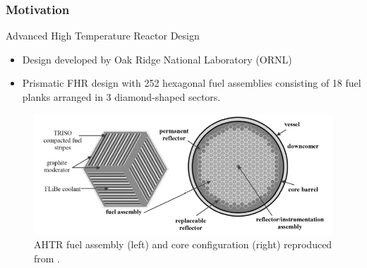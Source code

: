 \begin{frame}
  \frametitle{Motivation}
  \begin{block}{Advanced High Temperature Reactor Design}
    \begin{itemize}
      \item Design developed by Oak Ridge National Laboratory (ORNL)
      \item Prismatic FHR design with 252 hexagonal fuel assemblies consisting of 
      18 fuel planks arranged in 3 diamond-shaped sectors. 
    \end{itemize}
  \end{block}
  \begin{figure}[]
    \centering
    \includegraphics[width=0.8\linewidth]{../docs/figures/ahtr.png} 
    \caption{\acrlong{AHTR} fuel assembly (left) and core configuration (right) 
    reproduced from \cite{ramey_monte_2018}.}
    \label{fig:ahtr}
\end{figure}
\end{frame}

